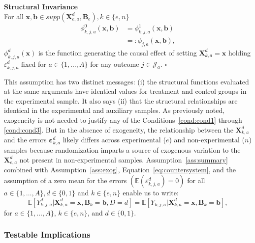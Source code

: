 \onehalfspacing
\begin{assumption} \label{ass:summary} \textbf{Structural Invariance}\\
For all $\bm{x}, \bm{b} \in supp(\bm{X}^d_{e,a}, \bm{B}_e), k \in \{e,n\}$
\begin{align}
\phi_{k,j,a}^0 \left( \bm{x}, \bm{b} \right) &= \phi_{k,j,a}^1 (\bm{x}, \bm{b}) \\   \nonumber
                                                                     &=: \phi_{j,a} (\bm{x}, \bm{b}),
\end{align}
$\phi^d_{k,j,a}(\bm{x})$ is the function generating the causal effect of setting $\bm{X}^d_{k,a}=\bm{x}$ holding $\varepsilon^d_{k,j,a}$ fixed for $a \in \{1,\dots,A\}$ for any outcome $j \in \mathcal{J}_{a}$. $\square$
\end{assumption}
\doublespacing

This assumption has two distinct messages: (i) the structural functions evaluated at the same arguments have identical values for treatment and control groups in the experimental sample. It also says (ii) that the structural relationships are identical in the experimental and auxiliary samples. As previously noted, exogeneity is not needed to justify any of the Conditions~\ref{cond:cond1} through \ref{cond:cond3}. But in the absence of exogeneity, the relationship between the $\bm{X}^d_{k,a}$ and the errors $\bm{\varepsilon}^d_{k,a}$ likely differs across experimental ($e$) and non-experimental ($n$) samples because randomization imparts a source of exogenous variation to the $\bm{X}^d_{e,a}$ not present in non-experimental samples. Assumption~\ref{ass:summary} combined with Assumption~\ref{ass:exog}, Equation~\eqref{eq:countersystem}, and the assumption of a zero mean for the errors $(\mathbb{E}(\varepsilon^d_{k,j,a})=0)$ for all $a \in \{1,\dots,A\}, d \in \{0,1\}$ and $k \in \{e,n\}$ enable us to write:
\begin{equation}\label{eq:invariancetest}
\mathbb{E} \left[ Y_{k,j,a}^d | \bm{X}_{k,a}^d  = \bm{x}, \bm{B}_k = \bm{b}, D = d \right] = \mathbb{E} \left[ Y_{k,j,a} | \bm{X}^d_{k,a}  = \bm{x}, \bm{B}_k = \bm{b} \right],
\end{equation}
for $a \in \{1,\dots,A\}$, $k \in \{e,n\}$, and $d \in \{0,1\}$.

\subsubsection{Testable Implications}

